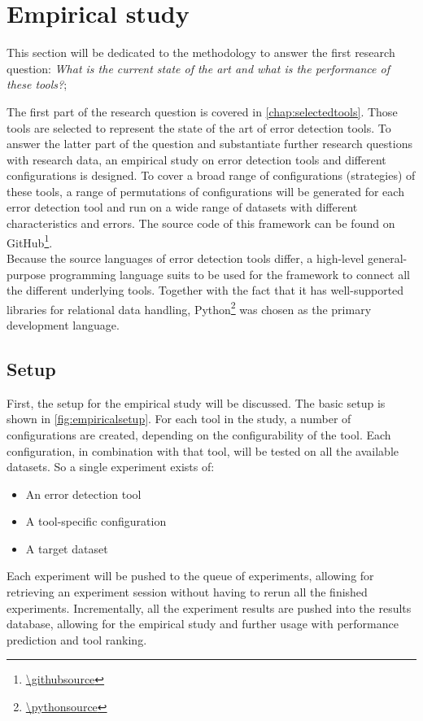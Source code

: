 \section{Empirical study}
\label{sec:empiricalstudy}
This section will be dedicated to the methodology to answer the first research question: \textit{What is the current state of the art and what is the performance of these tools?}; 

The first part of the research question is covered in \autoref{chap:selectedtools}. Those tools are selected to represent the state of the art of error detection tools.
To answer the latter part of the question and substantiate further research questions with research data, an empirical study on error detection tools and different configurations is designed. To cover a broad range of configurations (strategies) of these tools, a range of permutations of configurations will be generated for each error detection tool and run on a wide range of datasets with different characteristics and errors. The source code of this framework can be found on GitHub\footnote{\url{\githubsource}}.
~\\Because the source languages of error detection tools differ, a high-level general-purpose programming language suits to be used for the framework to connect all the different underlying tools. Together with the fact that it has well-supported libraries for relational data handling, Python\footnote{\url{\pythonsource}} was chosen as the primary development language.


\subsection{Setup}
\label{subsec:setup}
First, the setup for the empirical study will be discussed. The basic setup is shown in \autoref{fig:empiricalsetup}. For each tool in the study, a number of configurations are created, depending on the configurability of the tool. Each configuration, in combination with that tool, will be tested on all the available datasets. So a single experiment exists of:
\begin{itemize}
    \item An error detection tool
    \item A tool-specific configuration
    \item A target dataset
\end{itemize}

Each experiment will be pushed to the queue of experiments, allowing for retrieving an experiment session without having to rerun all the finished experiments. Incrementally, all the experiment results are pushed into the results database, allowing for the empirical study and further usage with performance prediction and tool ranking. 

